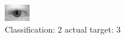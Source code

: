 \begin{figure}[h!]
\begin{center}
\includegraphics[width=0.60\columnwidth]{figures/ID542_class_2_target_3.png}
\end{center}
\caption{ Classification: 2 actual target: 3}
\label{fig:ID542_class_2_target_3}
\end{figure}
